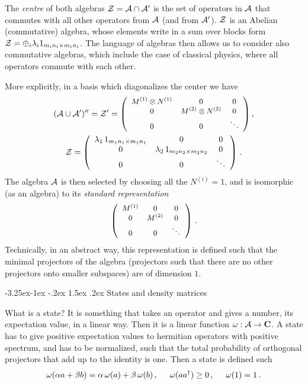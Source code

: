 \documentclass[11pt]{article}
\makeatletter
\renewcommand\subsection{\@startsection{subsection}{2}{\z@}%
                                   {-3.25ex\@plus -1ex \@minus -.2ex}%
                                     {1.5ex \@plus .2ex}%
                                     {\normalfont\bfseries}}
\numberwithin{equation}{section}
\newcommand{\be}{\begin{equation}}
\newcommand{\ee}{\end{equation}}
\makeatother
\begin{document}
The {\sl centre} of both algebras ${\cal Z}={\cal A}\cap {\cal A}'$ is the set of operators in ${\cal A}$ that commutes with all other operators from ${\cal A}$ (and from ${\cal A}'$). ${\cal Z}$ is an Abelian (commutative) algebra, whose elements write in a sum over blocks form ${\cal Z}=\oplus_i \lambda_i 1_{m_i n_i\times m_i n_i}$. The language of algebras then allows us to consider also commutative algebras, which include the case of classical physics, where all operators commute with each other.

More explicitly, in  a basis which diagonalizes the center we have
\begin{multline}
\small \small\small
({\cal A}\cup {\cal A}')''={\cal Z}'=
\left(\begin{array}{ccc}
  M^{(1)}\otimes N^{(1)} & 0 & 0\\
  0 & M^{(2)}\otimes N^{(2)} & 0 \\
  0 & 0 & \ddots
\end{array}\right), \\  {\cal Z}=
\left(\begin{array}{ccc}
  \lambda_1\,1_{m_1 n_1\times m_1 n_1} & 0 & 0 \\
  0 & \lambda_2\, 1_{m_2 n_2\times m_2 n_2} &  0 \\
  0 & 0 & \ddots
\end{array}\right)\,.
\end{multline} 
The algebra ${\cal A}$ is then selected by choosing all the $N^{(i)}=1$, and is isomorphic (as an algebra) to its {\sl standard representation}
\begin{equation}\small
 \left(\begin{array}{ccc}
  M^{(1)} & 0 & 0 \\
  0 & M^{(2)} & 0\\
  0 & 0 & \ddots
\end{array}\right)\,.
\end{equation}
Technically, in an abstract way, this representation is defined such that the minimal projectors of the algebra (projectors such that there are no other projectors onto smaller subspaces) are of dimension $1$.  

\subsection{States and density matrices}

What is a state? It is something that takes an operator and gives a number, its expectation value, in a linear way. Then it is a linear function $\omega: {\cal A}\rightarrow {\mathbf{C}}$. A state has to give positive expectation values to hermitian operators with positive spectrum, and has to be normalized, such that the total probability of orthogonal projectors that add up to the identity is one. Then a state is defined such 
\be
\omega(\alpha a+ \beta b)=\alpha \,\omega(a)+\beta\, \omega(b)\,, \hspace{.5cm} \omega(a a^\dagger)\ge 0\,, \hspace{0.5cm} \omega(1)=1\,. 
\ee 
 
\end{document}
